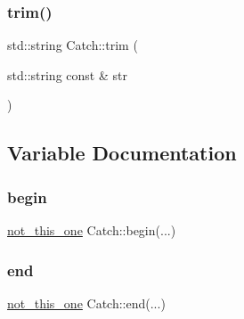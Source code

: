 \mbox{\label{namespace_catch_a084108b47f37d8bfd5db51c50c7451b3}} 
\subsubsection{\texorpdfstring{trim()}{trim()}}
{\footnotesize\ttfamily std\+::string Catch\+::trim (\begin{DoxyParamCaption}\item[{std\+::string const \&}]{str }\end{DoxyParamCaption})}



\subsection{Variable Documentation}
\mbox{\label{namespace_catch_ac7ccff5c186bffa3b448b218ecf15956}} 
\subsubsection{\texorpdfstring{begin}{begin}}
{\footnotesize\ttfamily \mbox{\hyperlink{struct_catch_1_1not__this__one}{not\+\_\+this\+\_\+one}} Catch\+::begin(...)}

\mbox{\label{namespace_catch_a71fef6a57614eb2d9751f8586ff6de6a}} 
\subsubsection{\texorpdfstring{end}{end}}
{\footnotesize\ttfamily \mbox{\hyperlink{struct_catch_1_1not__this__one}{not\+\_\+this\+\_\+one}} Catch\+::end(...)}

